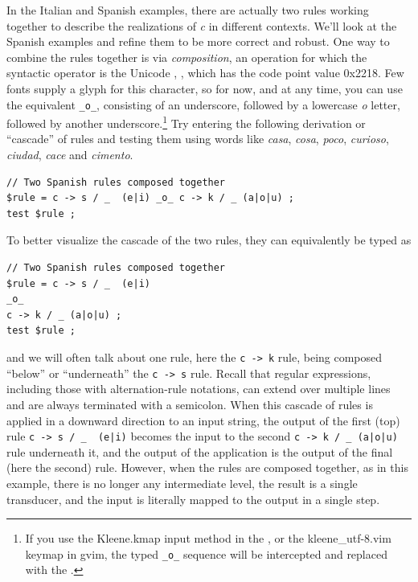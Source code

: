 In the Italian and Spanish examples, there are actually two rules working together to describe the realizations of
\emph{c} in different contexts.  We'll look at the Spanish examples and refine them to be more correct and robust.  One
way to combine the rules together is via \emph{composition}, an
operation for which the syntactic 
operator is the Unicode , \ringop{}, which
has the code point value 0x2218.  Few fonts supply a glyph for this
character, so for now, and at any time, you can use
the  equivalent \verb!_o_!, consisting of an
underscore, followed by a lowercase \emph{o} letter, followed by another underscore.\footnote{If you use the
	Kleene.kmap input method in the , or the kleene\_utf-8.vim
	keymap in gvim, the typed \verb!_o_! sequence will be
intercepted and replaced with the  \ringop{}.}
Try entering the following derivation or ``cascade'' of rules and testing them using words like \emph{casa},
\emph{cosa}, \emph{poco}, \emph{curioso}, \emph{ciudad}, \emph{cace} and \emph{cimento}.


\begin{Verbatim}
// Two Spanish rules composed together
$rule = c -> s / _  (e|i) _o_ c -> k / _ (a|o|u) ;
test $rule ;
\end{Verbatim}

To better visualize the cascade of the two rules, they can equivalently be typed as

\begin{Verbatim}
// Two Spanish rules composed together
$rule = c -> s / _  (e|i) 
_o_ 
c -> k / _ (a|o|u) ;
test $rule ;
\end{Verbatim}

\noindent
and we will often talk about one rule, here the \texttt{c -> k} rule,
being composed ``below'' or
``underneath'' the \texttt{c -> s} rule.  Recall that regular
expressions, including those with alternation-rule notations, can extend
over multiple lines and are always terminated with a semicolon.  When this cascade of rules is applied in a downward direction to an input
string, the output of the first (top) rule \verb!c -> s / _  (e|i)!
becomes the input to the second \verb!c -> k / _ (a|o|u)! rule
underneath it, and the output of the application is the output of the
final (here the second) rule.  However, when the rules are composed
together, as in this example, there is no longer any intermediate level,
the result is a single transducer, and the input is literally mapped to the output
in a single step.

